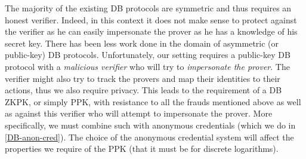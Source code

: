 The majority of the existing \ac{DB} protocols are symmetric and thus requires an honest verifier.
Indeed, in this context it does not make sense to protect against the verifier as he can easily impersonate the prover as he has a knowledge of his secret key.
There has been less work done in the domain of asymmetric (or public-key) \ac{DB} protocols.
Unfortunately, our setting requires a public-key \ac{DB} protocol with a \emph{malicious verifier} who will try to \emph{impersonate the prover}.
The verifier might also try to track the provers and map their identities to their actions, thus we also require privacy.
This leads to the requirement of a \ac{DB} \ac{ZKPK}, or simply \ac{PPK}, with resistance to all the frauds mentioned above as well as against this verifier who will attempt to impersonate the prover.
More specifically, we must combine such  with anonymous credentials (which we do in \cref{DB-anon-cred}).
The choice of the anonymous credential system will affect the properties we require of the \ac{PPK} (\eg that it must be  for discrete logarithms).